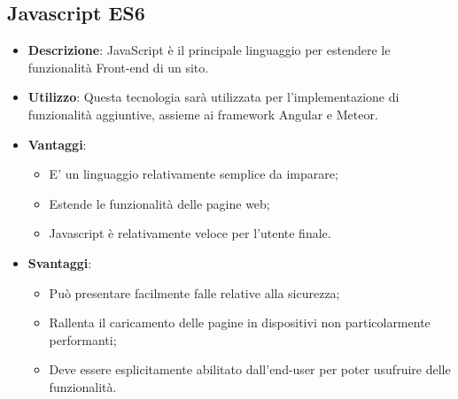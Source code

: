 \subsection{Javascript ES6}
\begin{itemize}
	\item \textbf{Descrizione}: JavaScript è il principale linguaggio per estendere le funzionalità Front-end di un sito.
	\item \textbf{Utilizzo}: Questa tecnologia sarà utilizzata per l'implementazione di funzionalità aggiuntive, assieme ai framework Angular e Meteor.
	\item \textbf{Vantaggi}:
	\begin{itemize}
		\item E' un linguaggio relativamente semplice da imparare;
		\item Estende le funzionalità delle pagine web;
		\item Javascript è relativamente veloce per l'utente finale.
	\end{itemize}
	\item \textbf{Svantaggi}:
	\begin{itemize}
		\item Può presentare facilmente falle relative alla sicurezza;
		\item Rallenta il caricamento delle pagine in dispositivi non particolarmente performanti;
		\item Deve essere esplicitamente abilitato dall'end-user per poter usufruire delle funzionalità.
	\end{itemize}
\end{itemize}

